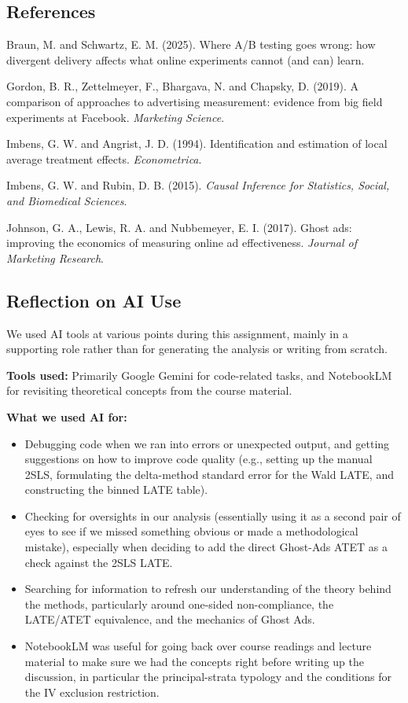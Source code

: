 \subsection{References}

Braun, M. and Schwartz, E. M. (2025). Where A/B testing goes wrong: how
divergent delivery affects what online experiments cannot (and can)
learn.

Gordon, B. R., Zettelmeyer, F., Bhargava, N. and Chapsky, D. (2019). A
comparison of approaches to advertising measurement: evidence from big
field experiments at Facebook. \emph{Marketing Science}.

Imbens, G. W. and Angrist, J. D. (1994). Identification and estimation
of local average treatment effects. \emph{Econometrica}.

Imbens, G. W. and Rubin, D. B. (2015). \emph{Causal Inference for
Statistics, Social, and Biomedical Sciences}.

Johnson, G. A., Lewis, R. A. and Nubbemeyer, E. I. (2017). Ghost ads:
improving the economics of measuring online ad effectiveness.
\emph{Journal of Marketing Research}.

\subsection{Reflection on AI Use}

We used AI tools at various points during this assignment, mainly in a
supporting role rather than for generating the analysis or writing from
scratch.

\textbf{Tools used:} Primarily Google Gemini for code-related tasks, and
NotebookLM for revisiting theoretical concepts from the course material.

\textbf{What we used AI for:}

\begin{itemize}
\tightlist
\item
  Debugging code when we ran into errors or unexpected output, and
  getting suggestions on how to improve code quality (e.g., setting up
  the manual 2SLS, formulating the delta-method standard error for the
  Wald LATE, and constructing the binned LATE table).
\item
  Checking for oversights in our analysis (essentially using it as a
  second pair of eyes to see if we missed something obvious or made a
  methodological mistake), especially when deciding to add the direct
  Ghost-Ads ATET as a check against the 2SLS LATE.
\item
  Searching for information to refresh our understanding of the theory
  behind the methods, particularly around one-sided non-compliance, the
  LATE/ATET equivalence, and the mechanics of Ghost Ads.
\item
  NotebookLM was useful for going back over course readings and lecture
  material to make sure we had the concepts right before writing up the
  discussion, in particular the principal-strata typology and the
  conditions for the IV exclusion restriction.
\end{itemize}

